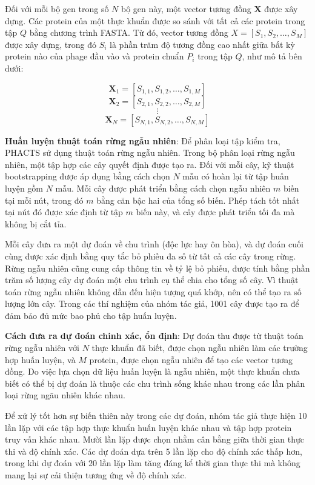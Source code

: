 Đối với mỗi bộ gen trong số \( N \) bộ gen này, một vector tương đồng \( \mathbf{X} \) được xây dựng. Các protein của một thực khuẩn được so sánh với tất cả các protein trong tập \( Q \) bằng chương trình FASTA. Từ đó, vector tương đồng $X = [S_1, S_2, \dots, S_M]$ được xây dựng, trong đó $S_i$ là phần trăm độ tương đồng cao nhất giữa bất kỳ protein nào của phage đầu vào và protein chuẩn $P_i$ trong tập $Q$, như mô tả bên dưới:

\[
\mathbf{X}_1 = [S_{1,1}, S_{1,2}, \ldots, S_{1,M}]
\]
\[
\mathbf{X}_2 = [S_{2,1}, S_{2,2}, \ldots, S_{2,M}]
\]
\[
\vdots
\]
\[
\mathbf{X}_N = [S_{N,1}, S_{N,2}, \ldots, S_{N,M}]
\]

\textbf{Huấn luyện thuật toán rừng ngẫu nhiên}: Để phân loại tập kiểm tra, PHACTS sử dụng thuật toán rừng ngẫu nhiên. Trong bộ phân loại rừng ngẫu nhiên, một tập hợp các cây quyết định được tạo ra. Đối với mỗi cây, kỹ thuật bootstrapping được áp dụng bằng cách chọn \( N \) mẫu có hoàn lại từ tập huấn luyện gồm \( N \) mẫu. Mỗi cây được phát triển bằng cách chọn ngẫu nhiên \( m \) biến tại mỗi nút, trong đó \( m \) bằng căn bậc hai của tổng số biến. Phép tách tốt nhất tại nút đó được xác định từ tập \( m \) biến này, và cây được phát triển tối đa mà không bị cắt tỉa.

Mỗi cây đưa ra một dự đoán về chu trình (độc lực hay ôn hòa), và dự đoán cuối cùng được xác định bằng quy tắc bỏ phiếu đa số từ tất cả các cây trong rừng. Rừng ngẫu nhiên cũng cung cấp thông tin về tỷ lệ bỏ phiếu, được tính bằng phần trăm số lượng cây dự đoán một chu trình cụ thể chia cho tổng số cây. Vì thuật toán rừng ngẫu nhiên không dẫn đến hiện tượng quá khớp, nên có thể tạo ra số lượng lớn cây. Trong các thí nghiệm của nhóm tác giả, 1001 cây được tạo ra để đảm bảo đủ mức bao phủ cho tập huấn luyện.

\textbf{Cách đưa ra dự đoán chinh xác, ổn định}: Dự đoán thu được từ thuật toán rừng ngẫu nhiên với \( N \) thực khuẩn đã biết, được chọn ngẫu nhiên làm các trường hợp huấn luyện, và \( M \) protein, được chọn ngẫu nhiên để tạo các vector tương đồng. Do việc lựa chọn dữ liệu huấn luyện là ngẫu nhiên, một thực khuẩn chưa biết có thể bị dự đoán là thuộc các chu trình sống khác nhau trong các lần phân loại rừng ngãu nhiên khác nhau.

Để xử lý tốt hơn sự biến thiên này trong các dự đoán, nhóm tác giả thực hiện 10 lần lặp với các tập hợp thực khuẩn huấn luyện khác nhau và tập hợp protein truy vấn khác nhau. Mười lần lặp được chọn nhằm cân bằng giữa thời gian thực thi và độ chính xác. Các dự đoán dựa trên 5 lần lặp cho độ chính xác thấp hơn, trong khi dự đoán với 20 lần lặp làm tăng đáng kể thời gian thực thi mà không mang lại sự cải thiện tương ứng về độ chính xác.

